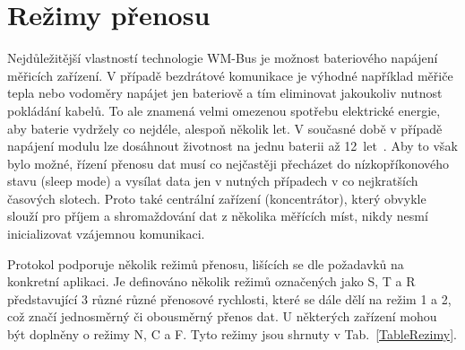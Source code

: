 \section{Režimy přenosu}
Nejdůležitější vlastností technologie WM-Bus je možnost bateriového napájení měřicích zařízení. V případě bezdrátové komunikace je výhodné například měřiče tepla nebo vodoměry napájet jen bateriově a tím eliminovat jakoukoliv nutnost pokládání kabelů. To ale znamená velmi omezenou spotřebu elektrické energie, aby baterie vydržely co nejdéle, alespoň několik let. V současné době v případě napájení modulu lze dosáhnout životnost na jednu baterii až 12~let~\cite{CidloBonega,CidloWeptech}. Aby to však bylo možné, řízení přenosu dat musí co nejčastěji přecházet do nízkopříkonového stavu (sleep mode) a vysílat data jen v nutných případech v co nejkratších časových slotech. Proto také centrální zařízení (koncentrátor), který obvykle slouží pro příjem a shromaždování dat z několika měřících míst, nikdy nesmí inicializovat vzájemnou komunikaci.

Protokol podporuje několik režimů přenosu, lišících se dle požadavků na konkretní aplikaci. Je definováno několik režimů označených jako S, T a R představující 3 různé různé přenosové rychlosti, které se dále dělí na režim 1 a 2, což značí jednosměrný či obousměrný přenos dat. U některých zařízení mohou být doplněny o režimy N, C a F. Tyto režimy jsou shrnuty v Tab.~\ref{TableRezimy}.

